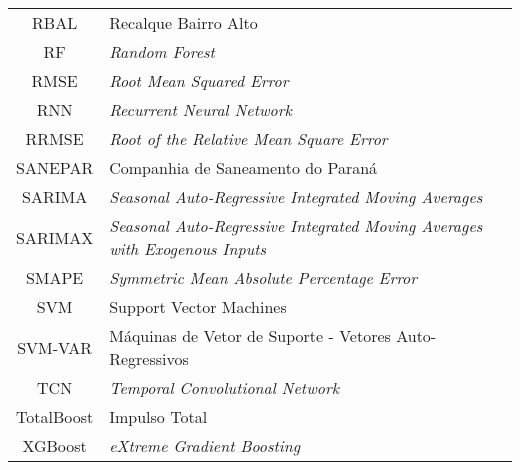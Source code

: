\begin{tabular}{cp{}}
	RBAL & Recalque Bairro Alto\\
	RF & \textit{Random Forest}\\
	RMSE & \textit{Root Mean Squared Error}\\
	RNN & \textit{Recurrent Neural Network}\\
	RRMSE & \textit{Root of the Relative Mean Square Error}\\
	SANEPAR & Companhia de Saneamento do Paraná \\
	SARIMA & \textit{Seasonal Auto-Regressive Integrated Moving Averages} \\
	SARIMAX & \textit{Seasonal Auto-Regressive Integrated Moving Averages with Exogenous Inputs} \\
	SMAPE &  \textit{Symmetric Mean Absolute Percentage Error}\\
	SVM & Support Vector Machines \\
	SVM-VAR & Máquinas de Vetor de Suporte - Vetores Auto-Regressivos\\
	TCN & \textit{Temporal Convolutional Network} \\
	TotalBoost & Impulso Total\\
	XGBoost & \textit{eXtreme Gradient Boosting}
\end{tabular}
